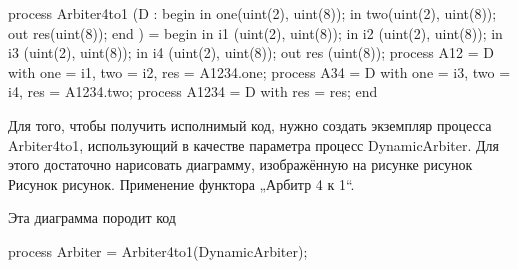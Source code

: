 process Arbiter4to1 (D : begin
  in one(uint(2), uint(8));
  in two(uint(2), uint(8));
  out res(uint(8));
  end
) =
begin
  in i1 (uint(2), uint(8));
  in i2 (uint(2), uint(8));
  in i3 (uint(2), uint(8));
  in i4 (uint(2), uint(8));
  out res (uint(8));
  process A12 = D with one = i1, two = i2, res = A1234.one;
  process A34 = D with one = i3, two = i4, res = A1234.two;
  process A1234 = D with res = res;
end

Для того, чтобы получить исполнимый код, нужно создать экземпляр процесса Arbiter4to1, использующий в качестве параметра процесс DynamicArbiter. Для этого достаточно нарисовать диаграмму, изображённую на рисунке рисунок
Рисунок рисунок. Применение функтора „Арбитр 4 к 1“.

Эта диаграмма породит код 

process Arbiter = Arbiter4to1(DynamicArbiter);

